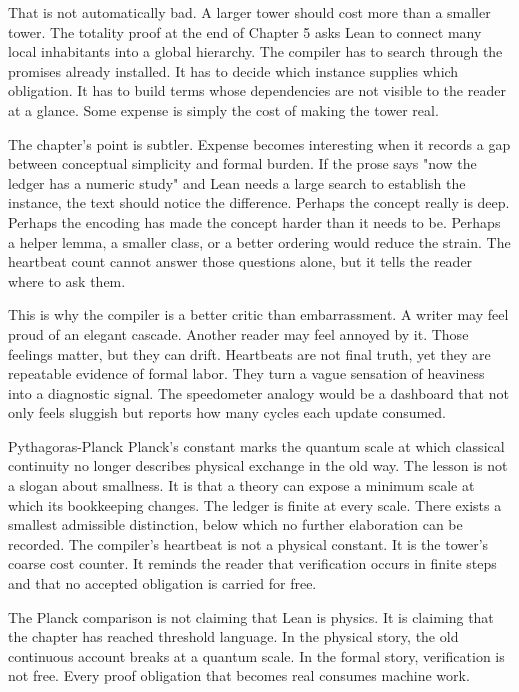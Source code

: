 That is not automatically bad. A larger tower should cost more than a smaller
tower. The totality proof at the end of Chapter 5 asks Lean to connect many
local inhabitants into a global hierarchy. The compiler has to search through
the promises already installed. It has to decide which instance supplies which
obligation. It has to build terms whose dependencies are not visible to the
reader at a glance. Some expense is simply the cost of making the tower real.

The chapter's point is subtler. Expense becomes interesting when it records a
gap between conceptual simplicity and formal burden. If the prose says "now
the ledger has a numeric study" and Lean needs a large search to establish the
instance, the text should notice the difference. Perhaps the concept really is
deep. Perhaps the encoding has made the concept harder than it needs to be.
Perhaps a helper lemma, a smaller class, or a better ordering would reduce the
strain. The heartbeat count cannot answer those questions alone, but it tells
the reader where to ask them.

This is why the compiler is a better critic than embarrassment. A writer may
feel proud of an elegant cascade. Another reader may feel annoyed by it. Those
feelings matter, but they can drift. Heartbeats are not final truth, yet they
are repeatable evidence of formal labor. They turn a vague sensation of
heaviness into a diagnostic signal. The speedometer analogy would be a
dashboard that not only feels sluggish but reports how many cycles each update
consumed.

\begin{gphenom}{Pythagoras-Planck}
\label{ph:pythagoras-planck}
\GPhObs Planck's constant marks the quantum scale at which classical
continuity no longer describes physical exchange in the old way. The lesson is
not a slogan about smallness. It is that a theory can expose a minimum scale at
which its bookkeeping changes.
\GPhCon The ledger is finite at every scale. There exists a smallest admissible
distinction, below which no further elaboration can be recorded.
\GPhSeq The compiler's heartbeat is not a physical constant. It is the tower's
coarse cost counter. It reminds the reader that verification occurs in finite
steps and that no accepted obligation is carried for free.
\end{gphenom}

The Planck comparison is not claiming that Lean is physics. It is claiming that
the chapter has reached threshold language. In the physical story, the old
continuous account breaks at a quantum scale. In the formal story, verification
is not free. Every proof obligation that becomes real consumes machine work.

